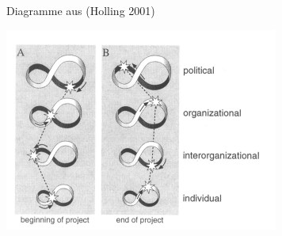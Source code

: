 \documentclass{beamer}
\begin{document}
\begin{frame}{Diagramme aus (Holling 2001)}
  \begin{center}
    \includegraphics[width=.85\textwidth]{Holling-5.png}
  \end{center}
\end{frame}
\end{document}

